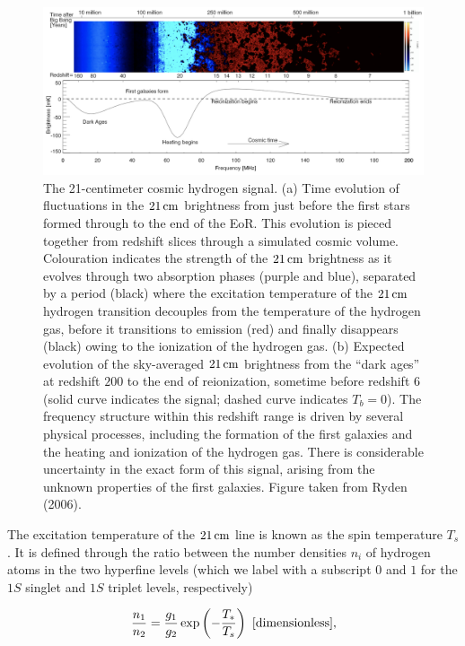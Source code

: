 \documentclass[a4paper,11pt]{article}
\begin{document}
\begin{figure}[t]
    \includegraphics[width=16cm]{figures/21cm.png}
    \centering
    \caption{\footnotesize{The 21-centimeter cosmic hydrogen signal. (a) Time evolution of fluctuations in the $21\,{\rm cm}$ brightness from just before the first stars formed through to the end of the EoR. This evolution is pieced together from redshift slices through a simulated cosmic volume. Colouration indicates the strength of the $21\,{\rm cm}$ brightness as it evolves through two absorption phases (purple and blue), separated by a period (black) where the excitation temperature of the $21\,{\rm cm}$ hydrogen transition decouples from the temperature of the hydrogen gas, before it transitions to emission (red) and finally disappears (black) owing to the ionization of the hydrogen gas. (b) Expected evolution of the sky-averaged $21\,{\rm cm}$ brightness from the ``dark ages'' at redshift $200$ to the end of reionization, sometime before redshift $6$ (solid curve indicates the signal; dashed curve indicates $T_b=0$). The frequency structure within this redshift range is driven by several physical processes, including the formation of the first galaxies and the heating and ionization of the hydrogen gas. There is considerable uncertainty in the exact form of this signal, arising from the unknown properties of the first galaxies. Figure taken from Ryden (2006).}}
    \label{fig:21cm}
\end{figure}

{\noindent}The excitation temperature of the $21\,{\rm cm}$ line is known as the spin temperature $T_s$. It is defined through the ratio between the number densities $n_i$ of hydrogen atoms in the two hyperfine levels (which we label with a subscript $0$ and $1$ for the $1S$ singlet and $1S$ triplet levels, respectively)

\begin{align*}
    \frac{n_1}{n_2} = \frac{g_1}{g_2}\exp\left(-\frac{T_*}{T_s}\right) ~ [{\rm dimensionless}],
\end{align*}
\end{document}
